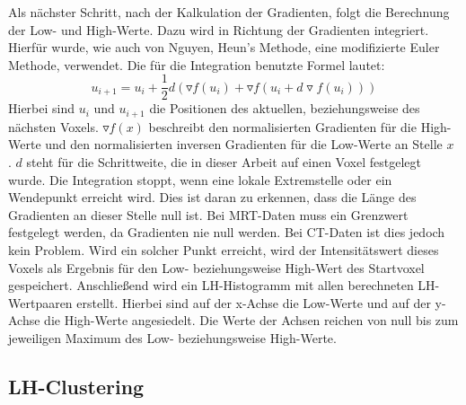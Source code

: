 Als nächster Schritt, nach der Kalkulation der Gradienten, folgt die Berechnung der Low- und High-Werte. Dazu wird in Richtung der Gradienten integriert. Hierfür wurde, wie auch von Nguyen, Heun's Methode, eine modifizierte Euler Methode, verwendet. Die für die Integration benutzte Formel lautet:
\begin{equation}
	u_{i+1} = u_{i} + \frac{1}{2}d(\triangledown f (u_{i}) + \triangledown f(u_{i}+d \triangledown f(u_{i}))) 
\end{equation}
Hierbei sind $u_{i}$ und $u_{i+1}$ die Positionen des aktuellen, beziehungsweise des nächsten Voxels. $\triangledown f(x)$ beschreibt den normalisierten Gradienten für die High-Werte und den normalisierten inversen Gradienten für die Low-Werte an Stelle $x$ . $d$ steht für die Schrittweite, die in dieser Arbeit auf einen Voxel festgelegt wurde.
Die Integration stoppt, wenn eine lokale Extremstelle oder ein Wendepunkt erreicht wird. Dies ist daran zu erkennen, dass die Länge des Gradienten an dieser Stelle null ist. Bei MRT-Daten muss ein Grenzwert festgelegt werden, da Gradienten nie null werden. Bei CT-Daten ist dies jedoch kein Problem. Wird ein solcher Punkt erreicht, wird der Intensitätswert dieses Voxels als Ergebnis für den Low- beziehungsweise High-Wert des Startvoxel gespeichert.
\newline
Anschließend wird ein LH-Histogramm mit allen berechneten LH-Wertpaaren erstellt. Hierbei sind auf der x-Achse die Low-Werte und auf der y-Achse die High-Werte angesiedelt. Die Werte der Achsen reichen von null bis zum jeweiligen Maximum des Low- beziehungsweise High-Werte.

\subsection{LH-Clustering}

